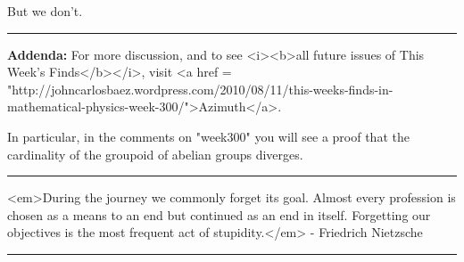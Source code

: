 But we don't. 
\par\noindent\rule{\textwidth}{0.4pt}
\textbf{Addenda:}
For more discussion, and to see <i><b>all future issues of This 
Week's Finds</b></i>, visit <a href = "http://johncarlosbaez.wordpress.com/2010/08/11/this-weeks-finds-in-mathematical-physics-week-300/">Azimuth</a>.

In particular, in the comments on "week300" you will see
a proof that the cardinality of the groupoid of abelian groups diverges.

\par\noindent\rule{\textwidth}{0.4pt}
<em>During the journey we commonly forget its goal. Almost every profession 
is chosen as a means to an end but continued as an end in itself. 
Forgetting our objectives is the most frequent act of stupidity.</em> - 
Friedrich Nietzsche

\par\noindent\rule{\textwidth}{0.4pt}


